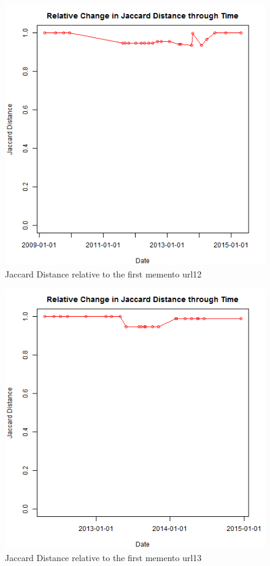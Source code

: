 \begin{figure}[ht]
	\begin{center}
		 \includegraphics[scale=0.60]{url12}
		  \caption{Jaccard Distance relative to the first memento url12}
	 \end{center}
\end{figure}
\begin{figure}[ht]
	\begin{center}
		 \includegraphics[scale=0.60]{url13}
		  \caption{Jaccard Distance relative to the first memento url13}
	 \end{center}
\end{figure}

